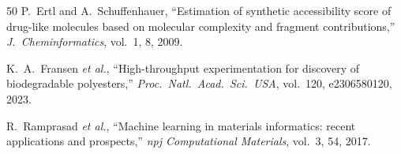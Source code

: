 \documentclass[twocolumn,10pt]{article}
\begin{document}
\begin{thebibliography}{50}
P.~Ertl and A.~Schuffenhauer, ``Estimation of synthetic accessibility score of drug-like molecules based on molecular complexity and fragment contributions,'' \textit{J.\ Cheminformatics}, vol.~1, 8, 2009.

K.~A.~Fransen \textit{et al.}, ``High-throughput experimentation for discovery of biodegradable polyesters,'' \textit{Proc.\ Natl.\ Acad.\ Sci.\ USA}, vol.~120, e2306580120, 2023.

R.~Ramprasad \textit{et al.}, ``Machine learning in materials informatics: recent applications and prospects,'' \textit{npj Computational Materials}, vol.~3, 54, 2017.

\end{thebibliography}
\end{document}
